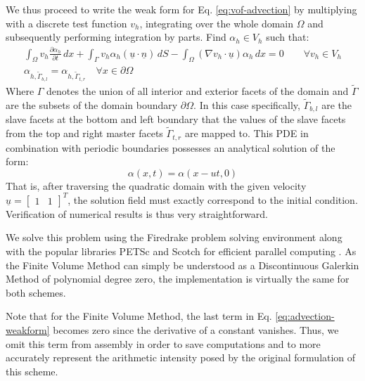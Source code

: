 \documentclass[sn-mathphys,Numbered]{sn-jnl}%
\theoremstyle{thmstyleone}%
\theoremstyle{thmstyletwo}%
\theoremstyle{thmstylethree}%
\begin{document}
We thus proceed to write the weak form for Eq. \ref{eq:vof-advection} by multiplying with a discrete test function $v_h$, integrating over the whole domain $\Omega$ and subsequently performing integration by parts. Find $\alpha_h \in V_h$ such that:
\begin{align}
    \int_\Omega v_h \frac{\partial \alpha_h}{\partial t} \,dx + \int_\Gamma v_h \alpha_h (\underline{u}\cdot\underline{n}) \,dS - \int_\Omega (\nabla v_h \cdot \underline{u}) \alpha_h \,dx = 0     \qquad \forall v_h \in V_h
    \label{eq:advection-weakform} \\
    \alpha_{h,\tilde{\Gamma}_{b,l}} = \alpha_{h,\tilde{\Gamma}_{t,r}} \quad \forall x \in \partial\Omega
\end{align}
Where $\Gamma$ denotes the union of all interior and exterior facets of the domain and $\tilde{\Gamma}$ are the subsets of the domain boundary $\partial \Omega$. In this case specifically, $\tilde{\Gamma}_{b,l}$ are the slave facets at the bottom and left boundary that the values of the slave facets from the top and right master facets $\tilde{\Gamma}_{t,r}$ are mapped to.
This PDE in combination with periodic boundaries possesses an analytical solution of the form:
\begin{equation}
    \alpha(x,t) = \alpha(x-ut,0)
\end{equation}
That is, after traversing the quadratic domain with the given velocity $\underline{u} = \begin{bmatrix}1 & 1 \end{bmatrix}^T$, the solution field must exactly correspond to the initial condition.
Verification of numerical results is thus very straightforward.

We solve this problem using the Firedrake problem solving environment along with the popular libraries PETSc and Scotch for efficient parallel computing \cite{FiredrakeUserManual,McRae2016,Homolya2016,Chaco95,PTSCOTCH,Rathgeber2016,Dalcin2011,petsc-efficient,petsc-user-ref}.
As the Finite Volume Method can simply be understood as a Discontinuous Galerkin Method of polynomial degree zero, the implementation is virtually the same for both schemes.

Note that for the Finite Volume Method, the last term in Eq. \ref{eq:advection-weakform} becomes zero since the derivative of a constant vanishes. Thus, we omit this term from assembly in order to save computations and to more accurately represent the arithmetic intensity posed by the original formulation of this scheme. 
\end{document}
